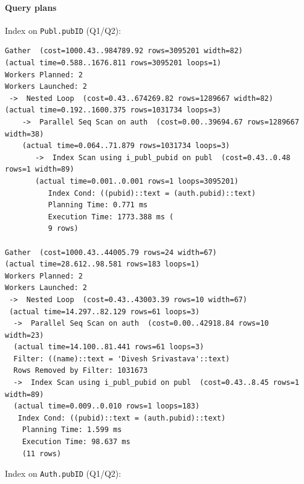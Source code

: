 \documentclass[11pt]{scrartcl}
\begin{document}
\paragraph{Query plans}\mbox{}

Index on \texttt{Publ.pubID} (Q1/Q2):

{\small
\parskip0pt\begin{verbatim}
Gather  (cost=1000.43..984789.92 rows=3095201 width=82) 
(actual time=0.588..1676.811 rows=3095201 loops=1)    
Workers Planned: 2    
Workers Launched: 2    
 ->  Nested Loop  (cost=0.43..674269.82 rows=1289667 width=82) 
(actual time=0.192..1600.375 rows=1031734 loops=3) 
    ->  Parallel Seq Scan on auth  (cost=0.00..39694.67 rows=1289667 width=38) 
    (actual time=0.064..71.879 rows=1031734 loops=3)         
       ->  Index Scan using i_publ_pubid on publ  (cost=0.43..0.48 rows=1 width=89) 
       (actual time=0.001..0.001 rows=1 loops=3095201)                
          Index Cond: ((pubid)::text = (auth.pubid)::text)  
          Planning Time: 0.771 ms  
          Execution Time: 1773.388 ms (
          9 rows)
          
Gather  (cost=1000.43..44005.79 rows=24 width=67) 
(actual time=28.612..98.581 rows=183 loops=1)    
Workers Planned: 2    
Workers Launched: 2   
 ->  Nested Loop  (cost=0.43..43003.39 rows=10 width=67) 
 (actual time=14.297..82.129 rows=61 loops=3)         
  ->  Parallel Seq Scan on auth  (cost=0.00..42918.84 rows=10 width=23) 
  (actual time=14.100..81.441 rows=61 loops=3)                
  Filter: ((name)::text = 'Divesh Srivastava'::text)                
  Rows Removed by Filter: 1031673          
  ->  Index Scan using i_publ_pubid on publ  (cost=0.43..8.45 rows=1 width=89) 
  (actual time=0.009..0.010 rows=1 loops=183)                
   Index Cond: ((pubid)::text = (auth.pubid)::text) 
    Planning Time: 1.599 ms  
    Execution Time: 98.637 ms 
    (11 rows) 
\end{verbatim}}

Index on \texttt{Auth.pubID} (Q1/Q2):
\end{document}
